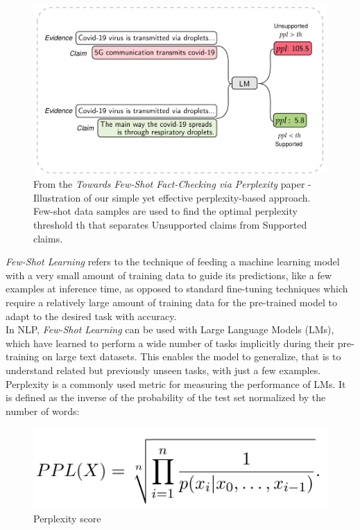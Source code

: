 \documentclass[10pt, english]{report}
\begin{document}
\begin{figure}[H]
	\centering
	\includegraphics[scale=0.3]{img/perplexity_example.png}
	\caption{From the \textit{Towards Few-Shot Fact-Checking via Perplexity} paper - Illustration of our simple yet effective perplexity-based approach. Few-shot data samples are used to find the optimal perplexity threshold th that separates Unsupported claims from Supported claims.}
\end{figure}

\textit{Few-Shot Learning} refers to the technique of feeding a machine learning model with a very small amount of training data to guide its predictions, like a few examples at inference time, as opposed to standard fine-tuning techniques which require a relatively large amount of training data for the pre-trained model to adapt to the desired task with accuracy.\\
In NLP, \textit{Few-Shot Learning} can be used with Large Language Models (LMs), which have learned to perform a wide number of tasks implicitly during their pre-training on large text datasets. This enables the model to generalize, that is to understand related but previously unseen tasks, with just a few examples.\\

Perplexity is a commonly used metric for measuring the performance of LMs. It is defined as the inverse of the probability of the test set normalized by the number of words:

\begin{figure}[H]
	\centering
	\includegraphics[scale=0.2]{img/perplexity_equation.png}
	\caption{Perplexity score}
\end{figure}
\end{document}
